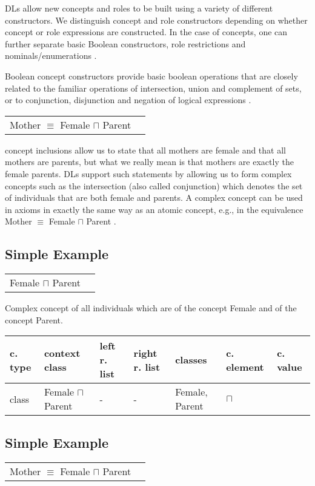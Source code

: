 \documentclass{llncs}
\newenvironment{gcotable}{
  \scriptsize
  \sffamily
  \vspace{0.3cm}
	\begin{center}
  \begin{tabular}{l|l|l|l|l|l|l}
  \hline
  \textbf{c. type} & \textbf{context class} & \textbf{left r. list} & \textbf{right r. list} & \textbf{classes} & \textbf{c. element} & \textbf{c. value} \\
  \hline

}{
  \hline
  \end{tabular}
	\end{center}
}
\newenvironment{DL}{
	\begin{center}
  \begin{tabular}{r l}

}{
  \end{tabular}
	\end{center}
}
\begin{document}
DLs allow new concepts and roles to be
built using a variety of different constructors. We distinguish concept and role 
constructors depending on whether concept or role expressions are constructed. In the case of
concepts, one can further separate basic Boolean constructors, role restrictions and nominals/enumerations \cite{Kroetzsch2012}.

Boolean concept constructors provide basic boolean operations that are closely related to
the familiar operations of intersection, union and complement of sets, or to conjunction,
disjunction and negation of logical expressions \cite{Kroetzsch2012}.

\begin{DL}
Mother $\equiv$ Female $\sqcap$ Parent
\end{DL}

concept inclusions allow us to state that all mothers are female and that
all mothers are parents, but what we really mean is that mothers are exactly the female
parents. DLs support such statements by allowing us to form complex concepts such as
the intersection (also called conjunction)
which denotes the set of individuals that are both female and parents. A complex concept
can be used in axioms in exactly the same way as an atomic concept, e.g., in the
equivalence Mother $\equiv$ Female $\sqcap$ Parent .

\subsection{Simple Example}

\begin{DL}
Female $\sqcap$ Parent
\end{DL}

Complex concept of all individuals which are of the concept Female and of the concept Parent.

\begin{gcotable}
class & Female $\sqcap$ Parent & - & - & Female, Parent & $\sqcap$ \\
\end{gcotable}

\subsection{Simple Example}

\begin{DL}
Mother $\equiv$ Female $\sqcap$ Parent
\end{DL}
\end{document}
